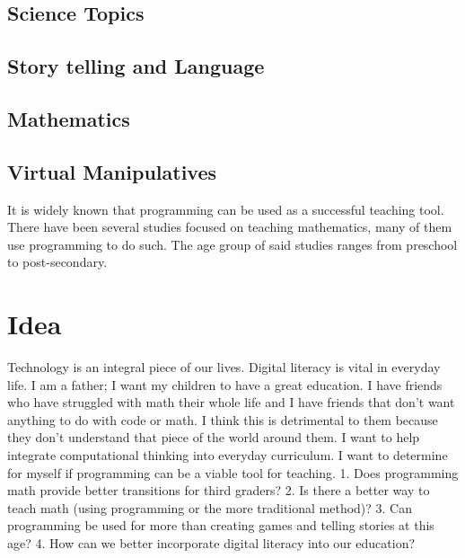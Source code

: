 \documentclass[12pt]{extarticle}
\begin{document}
\subsection{Science Topics} \cite{guzdial}
\subsection{Story telling and Language} \cite{}
\subsection{Mathematics} \cite{}
\subsection{Virtual Manipulatives}\cite{lyeComputation}

It is widely known that programming can be used as a successful teaching tool.
There have been several studies focused on teaching mathematics, many of them use programming to do such.
The age group of said studies ranges from preschool to post-secondary.

\section*{Idea}
Technology is an integral piece of our lives. Digital literacy is vital in everyday life.
I am a father; I want my children to have a great education.
I have friends who have struggled with math their whole life and I have friends that don't want anything to do with code or math. I think this is detrimental to them because they don't understand that piece of the world around them. 
I want to help integrate computational thinking into everyday curriculum.
I want to determine for myself if programming can be a viable tool for teaching.
1. Does programming math provide better transitions for third graders?
2. Is there a better way to teach math (using programming or the more traditional method)? 
3. Can programming be used for more than creating games and telling stories at this age?
4. How can we better incorporate digital literacy into our education?
\end{document}
